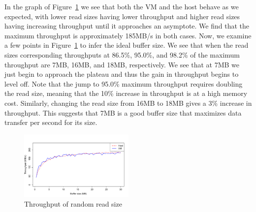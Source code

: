 In the graph of Figure~\ref{fig:p1graph} we see that both the VM and the host behave
as we expected, with lower read sizes having lower throughput and higher read sizes
having increasing throughput until it approaches an asymptote. We find that the 
maximum throughput is approximately 185MB/s in both cases. Now, we examine a few
points in Figure~\ref{fig:p1graph} to infer the ideal buffer size. We see that when 
the read sizes corresponding throughputs at 86.5\%, 95.0\%, and 98.2\% of the maximum 
throughput are 7MB, 16MB, and 18MB, respectively. We see that at 7MB we just begin to 
approach the plateau and thus the gain in throughput begins to level off.
Note that the jump to 95.0\% maximum throughput requires doubling the read size, 
meaning that the 10\% increase in throughput is at a high memory cost. Similarly, 
changing the read size from 16MB to 18MB gives a 3\% increase in throughput. This 
suggests that 7MB is a good buffer size that maximizes data transfer per second for its
size.

\begin{figure}[ht!]
	\includegraphics[width=0.5\textwidth]{./figures/p1.pdf}
	\caption{Throughput of random read size }
	\label{fig:p1graph}
\end{figure}


